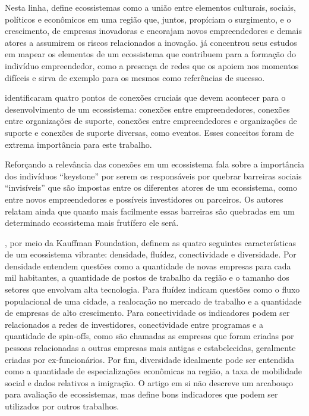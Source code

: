 Nesta linha,  define ecossistemas como a união entre elementos culturais, sociais, políticos e econômicos em uma região que, juntos, propíciam o surgimento, e o crescimento, de empresas inovadoras e encorajam novos empreendedores e demais atores a assumirem os riscos relacionados a inovação.  já concentrou seus estudos em mapear os elementos de um ecossistema que contribuem para a formação do indivíduo empreendedor, como a presença de redes que os apoiem nos momentos difíceis e sirva de exemplo para os mesmos como referências de sucesso. 

 identificaram quatro pontos de conexões cruciais que devem acontecer para o desenvolvimento de um ecossistema: conexões entre empreendedores, conexões entre organizações de suporte, conexões entre empreendedores e organizações de suporte e conexões de suporte diversas, como eventos. Esses conceitos foram de extrema importância para este trabalho.

Reforçando a relevância das conexões em um ecossistema  fala sobre a importância dos indivíduos ``keystone'' por serem os responsáveis por quebrar barreiras sociais ``invisíveis'' que são impostas entre os diferentes atores de um ecossistema, como entre novos empreendedores e possíveis investidores ou parceiros. Os autores relatam ainda que quanto mais facilmente essas barreiras são quebradas em um determinado ecossistema mais frutífero ele será.

, por meio da Kauffman Foundation, definem as quatro seguintes características de um ecossistema vibrante: densidade, fluídez, conectividade e diversidade. Por densidade entendem questões como a quantidade de novas empresas para cada mil habitantes, a quantidade de postos de trabalho da região e o tamanho dos setores que envolvam alta tecnologia. Para fluídez indicam questões como o fluxo populacional de uma cidade, a realocação no mercado de trabalho e a quantidade de empresas de alto crescimento. Para conectividade os indicadores podem ser relacionados a redes de investidores, conectividade entre programas e a quantidade de spin-offs, como são chamadas as empresas que foram criadas por pessoas relacionadas a outras empresas mais antigas e estabelecidas, geralmente criadas por ex-funcionários. Por fim, diversidade idealmente pode ser entendida como a quantidade de especializações econômicas na região, a taxa de mobilidade social e dados relativos a imigração. O artigo em si não descreve um arcabouço para avaliação de ecossistemas, mas define bons indicadores que podem ser utilizados por outros trabalhos.


